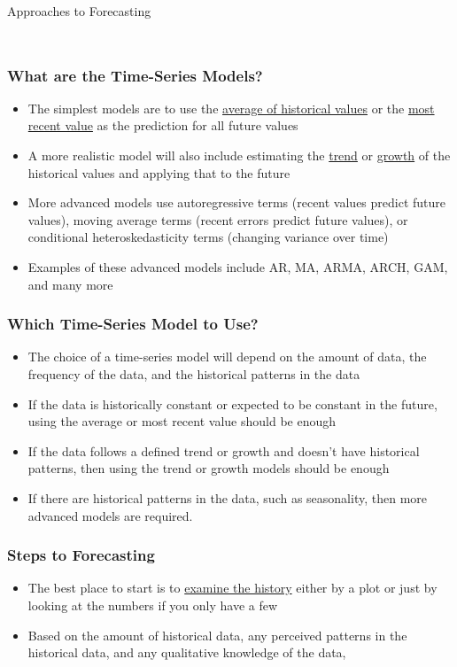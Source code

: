 \documentclass[handout, 11pt]{beamer}
\begin{document}
\begin{section}{Approaches to Forecasting}
\begin{frame}
\begin{columns}
\begin{column}{0.5\textwidth}
{\vfill
\vfill}
\end{column}
\end{columns}
\end{frame}
\begin{frame}
\frametitle{What are the Time-Series Models?}
\begin{itemize}
\item The simplest models are to use the
\underline{average of historical values}
or the
\underline{most recent value}
as the prediction for all future values
\vfill
\item A more realistic model will also include estimating the
\underline{trend}
or \underline{growth} of the historical values and applying that to the future
\vfill
\item More advanced models use autoregressive terms (recent values predict future values), moving average terms (recent errors predict future values), or conditional heteroskedasticity terms (changing variance over time)
\vfill
\item Examples of these advanced models include AR, MA, ARMA, ARCH, GAM, and many more
\end{itemize}
\end{frame}
\begin{frame}
\frametitle{Which Time-Series Model to Use?}
\begin{itemize}
\item The choice of a time-series model will depend on the amount of data, the frequency of the data, and the historical patterns in the data
\vfill
\item If the data is historically constant or expected to be constant in the future, using the average or most recent value should be enough
\vfill
\item If the data follows a defined trend or growth and doesn't have historical patterns, then using the trend or growth models should be enough
\vfill
\item If there are historical patterns in the data, such as seasonality, then more advanced models are required.
\end{itemize}
\end{frame}
\begin{frame}
\frametitle{Steps to Forecasting}
\begin{itemize}
\item The best place to start is to
\underline{examine the history}
either by a plot
or just by looking at the numbers if you only have a few
\vfill
\item Based on the amount of historical data, any perceived patterns in the historical data, and any qualitative knowledge of the data,

\end{itemize}
\end{frame}
\end{section}
\end{document}
